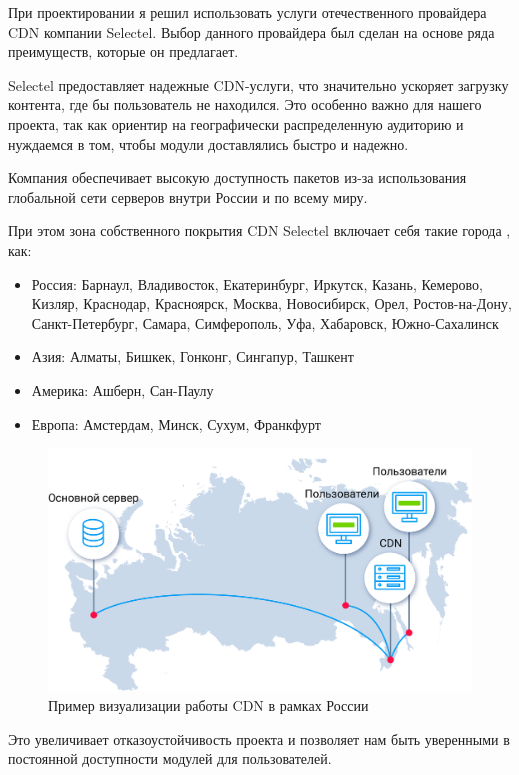  При проектировании я решил использовать услуги отечественного провайдера CDN компании Selectel. \cite{cdn:selectel} Выбор данного провайдера был сделан на основе ряда преимуществ, которые он предлагает.

Selectel предоставляет надежные CDN-услуги, что значительно ускоряет загрузку контента, где бы пользователь не находился. Это особенно важно для нашего проекта, так как ориентир на географически распределенную аудиторию и нуждаемся в том, чтобы модули доставлялись быстро и надежно.

Компания обеспечивает высокую доступность пакетов из-за использования глобальной сети серверов внутри России и по всему миру.

При этом зона собственного покрытия CDN Selectel включает себя такие города \cite{cdn:selectel}, как:
\begin{itemize}
    \item Россия: Барнаул, Владивосток, Екатеринбург, Иркутск, Казань, Кемерово, Кизляр, Краснодар, Красноярск, Москва, Новосибирск, Орел, Ростов-на-Дону, Санкт-Петербург, Самара, Симферополь, Уфа, Хабаровск, Южно-Сахалинск
    \item Азия: Алматы, Бишкек, Гонконг, Сингапур, Ташкент
    \item Америка: Ашберн, Сан-Паулу
    \item Европа: Амстердам, Минск, Сухум, Франкфурт
\end{itemize}

\begin{figure}
  \centering
  \includegraphics[width=.8\textwidth]{graphics/img/cdn.scheme.5Y4Ydf}
  \caption{Пример визуализации работы CDN в рамках России}
  \label{fig:cdn_russia}
\end{figure}

Это увеличивает отказоустойчивость проекта и позволяет нам быть уверенными в постоянной доступности модулей для пользователей.

